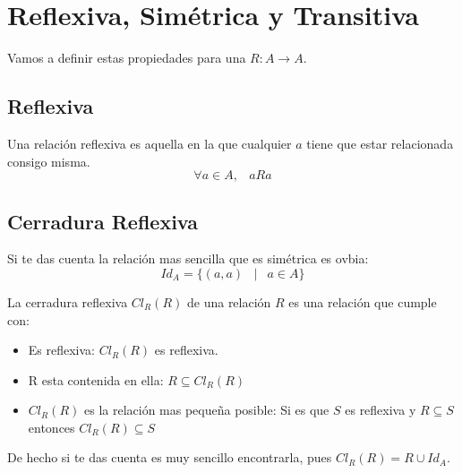 \documentclass[12pt, fleqn]{report}                             %
\DeclareMathOperator \Space     {\quad}                         %
\DeclareMathOperator \MiniSpace {\;}                            %
\newcommand \Such           {\MiniSpace | \MiniSpace}           %
\theoremstyle{break}                                            %
\begin{document}
        \section{Reflexiva, Simétrica y Transitiva}

            Vamos a definir estas propiedades para una $R: A \to A$.
                
            \subsection{Reflexiva}

                Una relación reflexiva es aquella en la que cualquier $a$ tiene que estar relacionada
                consigo misma.
                \begin{equation*}
                    \forall a \in A, \MiniSpace aRa
                \end{equation*}


            \subsection*{Cerradura Reflexiva}

                Si te das cuenta la relación mas sencilla que es simétrica es ovbia:
                \begin{equation*}
                    Id_A = \{ (a, a) \Such a \in A \}
                \end{equation*}


                La cerradura reflexiva $Cl_R(R)$ de una relación $R$ es una relación que cumple con:

                \begin{itemize}
                    \item Es reflexiva: $Cl_R(R)$ es reflexiva. 
                    \item R esta contenida en ella: $R \subseteq Cl_R(R)$
                    \item $Cl_R(R)$ es la relación mas pequeña posible: 
                    Si es que $S$ es reflexiva y $R \subseteq S$ entonces $Cl_R(R) \subseteq S$
                \end{itemize}



                De hecho si te das cuenta es muy sencillo encontrarla, pues
                $Cl_R(R) = R \cup Id_A$.
\end{document}
